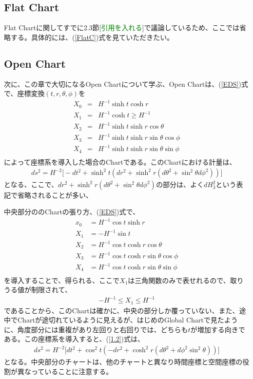\subsection{Flat Chart}
Flat Chartに関してすでに2.3節[\textcolor{green}{引用を入れる}]で議論しているため、ここでは省略する。具体的には、(\ref{FlatC})式を見ていただきたい。
\subsection{Open Chart}
次に、この章で大切になるOpen Chartについて学ぶ、Open Chartは、(\ref{EDS})式で、座標変換$(t,r,\theta,\phi)$を
\begin{eqnarray}
  X_0&=&H^{-1}\sinh{t}\cosh{r} \\
  X_1&=&H^{-1}\cosh{t} \geqslant H^{-1} \\
  X_2&=&H^{-1}\sinh{t}\sinh{r}\cos{\theta} \\
  X_3&=&H^{-1}\sinh{t}\sinh{r}\sin{\theta}\cos{\phi} \\
  X_4&=&H^{-1}\sinh{t}\sinh{r}\sin{\theta}\sin{\phi} \\
\end{eqnarray}
によって座標系を導入した場合のChartである。このChartにおける計量は、
\begin{eqnarray}
\label{openM}
      ds^2=H^{-2}\biggr[-dt^2+\sinh^2{t}(dr^2+\sinh^2r(d\theta^2+\sin^2\theta d\phi^2))\biggr]
\end{eqnarray}
となる、ここで、$dr^2+\sinh^2r(d\theta^2+\sin^2\theta d\phi^2)$の部分は、よく$dH_3^2$という表記で省略されることが多い、

中央部分ののChartの張り方、(\ref{EDS})式で、
\begin{align}
  \label{1.19}
  x_0&=H^{-1}\cos{t}\sinh{r} \\
  \label{test}
  X_1&=-H^{-1}\sin{t} \\
  X_2&=H^{-1}\cos{t}\cosh{r}\cos{\theta} \\
  X_3&=H^{-1}\cos{t}\cosh{r}\sin{\theta}\cos{\phi} \\
  X_4&=H^{-1}\cos{t}\cosh{r}\sin{\theta}\sin{\phi} \\
\end{align}
を導入することで、得られる、ここで$X_1$は三角関数のみで表せれるので、取りうる値が制限されて、
\begin{align}
  -H^{-1} \leqslant X_1 \leqslant H^{-1}
\end{align}
であることから、このChartは確かに、中央の部分しか覆っていない、また、途中でChartが途切れているように見えるが、はじめのGlobal Chartで見たように、角度部分には重複があり左回りと右回りでは、どちらも$t$が増加する向きである。この座標系を導入すると、(\ref{1.2})式は、
\begin{align}
\label{CenterM}
  ds^2=H^{-2}\biggl[dt^2+\cos^2t(-dr^2+\cosh^2r(d\theta^2+d\phi^2\sin^2\theta))\biggr]
\end{align}
となる。中央部分のチャートは、他のチャートと異なり時間座標と空間座標の役割が異なっていることに注意する。

